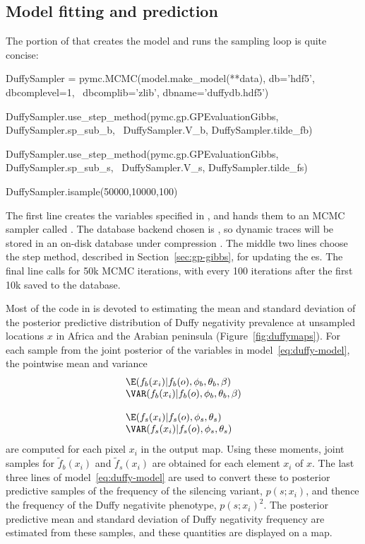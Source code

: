 \documentclass[article]{jss}
\begin{document}
\subsection{Model fitting and prediction}
The portion of  that creates the model and runs the sampling loop is quite concise: 
\begin{CodeInput}
DuffySampler = pymc.MCMC(model.make_model(**data), db='hdf5', dbcomplevel=1, \
    dbcomplib='zlib', dbname='duffydb.hdf5')

DuffySampler.use_step_method(pymc.gp.GPEvaluationGibbs, DuffySampler.sp_sub_b, \
    DuffySampler.V_b, DuffySampler.tilde_fb)

DuffySampler.use_step_method(pymc.gp.GPEvaluationGibbs, DuffySampler.sp_sub_s, \
    DuffySampler.V_s, DuffySampler.tilde_fs)

DuffySampler.isample(50000,10000,100)    
\end{CodeInput}
The first line creates the variables specified in , and hands them to an MCMC sampler called . The database backend chosen is , so dynamic traces will be stored in an on-disk  database under compression \citep{pymc}. The middle two lines choose the  step method, described in Section~\ref{sec:gp-gibbs}, for updating the es. The final line calls for 50k MCMC iterations, with every 100 iterations after the first 10k saved to the database.

\bigskip
Most of the code in \code{mcmc.py} is devoted to estimating the mean and standard deviation of the posterior predictive distribution of Duffy negativity prevalence at unsampled locations $x$ in Africa and the Arabian peninsula (Figure~\ref{fig:duffymaps}). For each sample from the joint posterior of the variables in model~\ref{eq:duffy-model}, 
the pointwise mean and variance 
\begin{equation}
    \label{eq:map-moments} 
    \begin{array}{l}
        \E(f_b(x_i)|f_b(o), \phi_b, \theta_b, \beta)\\
        \VAR(f_b(x_i)|f_b(o), \phi_b, \theta_b, \beta)\\\\
        \E(f_s(x_i)|f_s(o), \phi_s, \theta_s)\\
        \VAR(f_s(x_i)|f_s(o), \phi_s, \theta_s)
    \end{array}
\end{equation}
are computed for each pixel $x_i$ in the output map. Using these moments, joint samples for $\tilde f_b(x_i)$ and $\tilde f_s(x_i)$ are obtained for each element $x_i$ of $x$. The last three lines of model~\ref{eq:duffy-model} are used to convert these to posterior predictive samples of the frequency of the silencing variant, $p(s;x_i)$, and thence the frequency of the Duffy negativite phenotype, $p(s;x_i)^2$. The posterior predictive mean and standard deviation of Duffy negativity frequency are estimated from these samples, and these quantities are displayed on a map.
\end{document}
